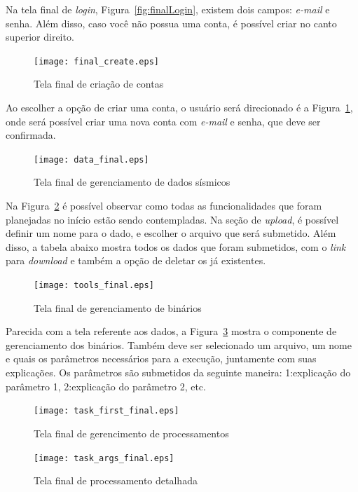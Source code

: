\documentclass[11pt,twoside]{article}
\begin{document}
Na tela final de \emph{login}, Figura~\ref{fig:finalLogin}, existem dois campos: \emph{e-mail} e senha. Além disso, caso você não possua uma conta, é possível criar no canto superior direito.

\begin{figure}[!h]
  \centering
  \texttt{[image: final\_create.eps]}
  \caption{Tela final de criação de contas}
  \label{fig:finalCreate}
\end{figure}

 Ao escolher a opção de criar uma conta, o usuário será direcionado é a Figura~\ref{fig:finalCreate}, onde será possível criar uma nova conta com \emph{e-mail} e senha, que deve ser confirmada.

\begin{figure}[!h]
  \centering
  \texttt{[image: data\_final.eps]}
  \caption{Tela final de gerenciamento de dados sísmicos}
  \label{fig:finalData}
\end{figure}

Na Figura~\ref{fig:finalData} é possível observar como todas as funcionalidades que foram planejadas no início estão sendo contempladas. Na seção de \emph{upload}, é possível definir um nome para o dado, e escolher o 
arquivo que será submetido. Além disso, a tabela abaixo mostra todos os dados que foram submetidos, com o \emph{link} para \emph{download} e também a opção de deletar os já existentes.

\begin{figure}[!h]
  \centering
  \texttt{[image: tools\_final.eps]}
  \caption{Tela final de gerenciamento de binários}
  \label{fig:finalTools}
\end{figure}

Parecida com a tela referente aos dados, a Figura~\ref{fig:finalTools} mostra o componente de gerenciamento dos binários. Também deve
ser selecionado um arquivo, um nome e quais os parâmetros necessários para a execução, juntamente com suas explicações. Os parâmetros são submetidos da seguinte maneira: 1:explicação do parâmetro 1,
2:explicação do parâmetro 2, etc.

\begin{figure}[!h]
  \centering
  \texttt{[image: task\_first\_final.eps]}
  \caption{Tela final de gerencimento de processamentos}
  \label{fig:finalTasks}
\end{figure}

\begin{figure}[!h]
  \centering
  \texttt{[image: task\_args\_final.eps]}
  \caption{Tela final de processamento detalhada}
  \label{fig:finalDetailedTask}
\end{figure}
\end{document}
